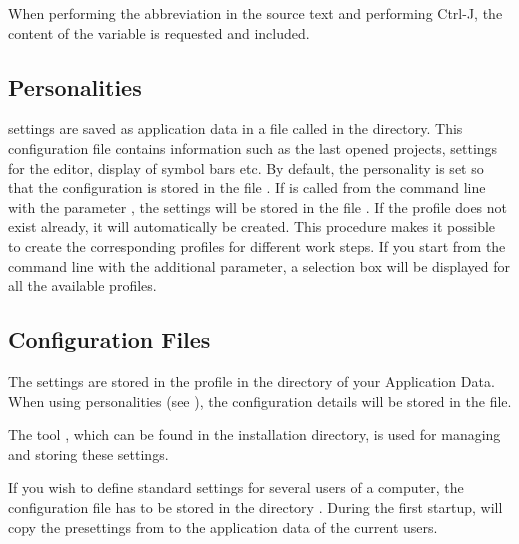 When performing the abbreviation  in the source text and performing Ctrl-J, the content of the variable is requested and included.

\subsection{Personalities}\label{sec:personalities}

\codeblocks settings are saved as application data in a file called  in the  directory. This configuration file contains information such as the last opened projects, settings for the editor, display of symbol bars etc. By default, the  personality is set so that the configuration is stored in the file . If \codeblocks is called from the command line with the parameter , the settings will be stored in the file . If the profile does not exist already, it will automatically be created. This procedure makes it possible to create the corresponding profiles for different work steps. If you start \codeblocks from the command line with the additional parameter, a selection box will be displayed for all the available profiles.


\subsection{Configuration Files}

The \codeblocks settings are stored in the  profile in the  directory of your Application Data. When using personalities (see ), the configuration details will be stored in the  file.

The tool , which can be found in the \codeblocks installation directory, is used for managing and storing these settings.

If you wish to define standard settings for several users of a computer, the configuration file  has to be stored in the directory . During the first startup, \codeblocks will copy the presettings from  to the application data of the current users.

